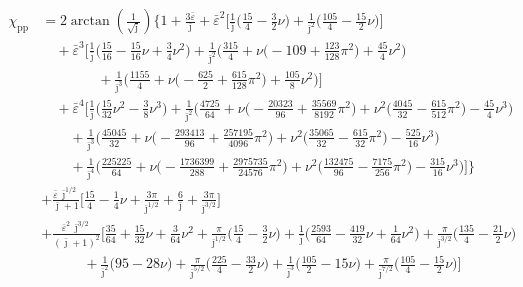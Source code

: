 \documentclass[prd,superscriptaddress,preprintnumbers,tightenlines,nofootinbib, eqsecnum]{revtex4-2}
\newcommand{\nn}{\nonumber}
\begin{document}
\begin{align}
\chi_\text{pp loc} &= 2\arctan\!\left(\frac{1}{\sqrt{\bar{\jmath}}}\right)\Bigg\{1 + \frac{3\bar{\varepsilon}}{\bar{\jmath}} + \bar{\varepsilon}^{2}\Bigg[\frac{1}{\bar{\jmath}}\Bigg(\frac{15}{4} - \frac{3}{2}\nu\Bigg) + \frac{1}{\bar{\jmath}^{2}}\Bigg(\frac{105}{4} - \frac{15}{2}\nu\Bigg)\Bigg] \nn \\
&\quad + \bar{\varepsilon}^{3}\Bigg[
\frac{1}{\bar{\jmath}}\Bigg(\frac{15}{16} - \frac{15}{16}\nu + \frac{3}{4}\nu^{2}\Bigg) + \frac{1}{\bar{\jmath}^{2}}\Bigg(\frac{315}{4} + \nu\bigg(-109 + \frac{123}{128}\pi^{2}\bigg) + \frac{45}{4}\nu^{2}\Bigg) \nn\\
&\qquad\qquad+ \frac{1}{\bar{\jmath}^{3}}\Bigg(\frac{1155}{4} + \nu\bigg(-\frac{625}{2} + \frac{615}{128}\pi^{2}\bigg) + \frac{105}{8}\nu^{2}\Bigg)\Bigg] \nn \\
&\quad + \bar{\varepsilon}^{4}\Bigg[
\frac{1}{\bar{\jmath}}\Bigg(\frac{15}{32}\nu^{2} - \frac{3}{8}\nu^{3}\Bigg) + \frac{1}{\bar{\jmath}^{2}}\Bigg(\frac{4725}{64} + \nu\bigg(-\frac{20323}{96} + \frac{35569}{8192}\pi^{2}\bigg) + \nu^{2}\bigg(\frac{4045}{32} - \frac{615}{512}\pi^{2}\bigg) - \frac{45}{4}\nu^{3}\Bigg) \nn \\
&\qquad + \frac{1}{\bar{\jmath}^{3}}\Bigg(\frac{45045}{32} + \nu\bigg(-\frac{293413}{96} + \frac{257195}{4096}\pi^{2}\bigg) + \nu^{2}\bigg(\frac{35065}{32} - \frac{615}{32}\pi^{2}\bigg) - \frac{525}{16}\nu^{3}\Bigg) \nn \\
&\qquad + \frac{1}{\bar{\jmath}^{4}}\Bigg(\frac{225225}{64} + \nu\bigg(-\frac{1736399}{288} + \frac{2975735}{24576}\pi^{2}\bigg) + \nu^{2}\bigg(\frac{132475}{96} - \frac{7175}{256}\pi^{2}\bigg) - \frac{315}{16}\nu^{3}\Bigg)\Bigg]\Bigg\} \nn \\
&+ \frac{\bar{\varepsilon}\,\bar{\jmath}^{1/2}}{\bar{\jmath}+1}\Bigg[
\frac{15}{4} - \frac{1}{4}\nu + \frac{3 \pi}{\bar{\jmath}^{1/2}} + \frac{6}{\bar{\jmath}} + \frac{3 \pi}{\bar{\jmath}^{3/2}}\Bigg] \nn \\
&+ \frac{\bar{\varepsilon}^{2}\,\bar{\jmath}^{3/2}}{(\bar{\jmath}+1)^{2}}\Bigg[
\frac{35}{64} + \frac{15}{32}\nu + \frac{3}{64}\nu^{2} + \frac{\pi}{\bar{\jmath}^{1/2}}\Bigg(\frac{15}{4} - \frac{3}{2}\nu\Bigg) + \frac{1}{\bar{\jmath}}\Bigg(\frac{2593}{64} - \frac{419}{32}\nu + \frac{1}{64}\nu^{2}\Bigg) + \frac{\pi}{\bar{\jmath}^{3/2}}\Bigg(\frac{135}{4} - \frac{21}{2}\nu\Bigg) \nn \\
&\qquad\quad + \frac{1}{\bar{\jmath}^{2}}\Bigg(95 - 28 \nu\Bigg)  + \frac{\pi}{\bar{\jmath}^{5/2}}\Bigg(\frac{225}{4} - \frac{33}{2}\nu\Bigg) + \frac{1}{\bar{\jmath}^{3}}\Bigg(\frac{105}{2} - 15 \nu\Bigg) + \frac{\pi}{\bar{\jmath}^{7/2}}\Bigg(\frac{105}{4} - \frac{15}{2}\nu\Bigg)\Bigg] \nn \\

\end{align}
\end{document}
